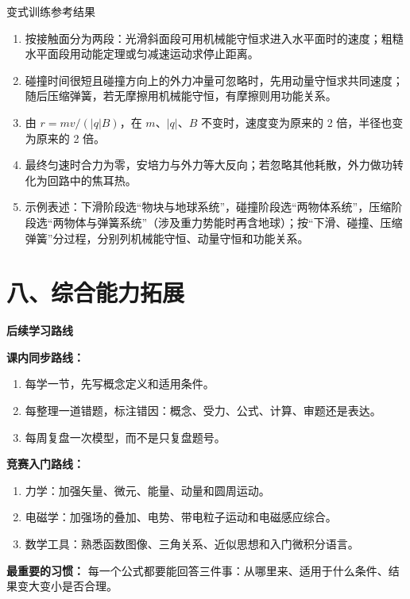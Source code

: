 \begin{learningbox}{变式训练参考结果}
\begin{enumerate}[itemsep=0.45em,topsep=0.3em,parsep=0pt]
  \item 按接触面分为两段：光滑斜面段可用机械能守恒求进入水平面时的速度；粗糙水平面段用动能定理或匀减速运动求停止距离。
  \item 碰撞时间很短且碰撞方向上的外力冲量可忽略时，先用动量守恒求共同速度；随后压缩弹簧，若无摩擦用机械能守恒，有摩擦则用功能关系。
  \item 由 $r=mv/(|q|B)$，在 $m$、$|q|$、$B$ 不变时，速度变为原来的 2 倍，半径也变为原来的 2 倍。
  \item 最终匀速时合力为零，安培力与外力等大反向；若忽略其他耗散，外力做功转化为回路中的焦耳热。
  \item 示例表述：下滑阶段选“物块与地球系统”，碰撞阶段选“两物体系统”，压缩阶段选“两物体与弹簧系统”（涉及重力势能时再含地球）；按“下滑、碰撞、压缩弹簧”分过程，分别列机械能守恒、动量守恒和功能关系。
\end{enumerate}
\end{learningbox}

\section*{八、综合能力拓展}
\begin{competitionbox}
\textbf{后续学习路线}

\begin{center}


\label{fig:learning-route-map}
\end{center}

\textbf{课内同步路线：}
\begin{enumerate}
  \item 每学一节，先写概念定义和适用条件。
  \item 每整理一道错题，标注错因：概念、受力、公式、计算、审题还是表达。
  \item 每周复盘一次模型，而不是只复盘题号。
\end{enumerate}

\textbf{竞赛入门路线：}
\begin{enumerate}
  \item 力学：加强矢量、微元、能量、动量和圆周运动。
  \item 电磁学：加强场的叠加、电势、带电粒子运动和电磁感应综合。
  \item 数学工具：熟悉函数图像、三角关系、近似思想和入门微积分语言。
\end{enumerate}

\textbf{最重要的习惯：} 每一个公式都要能回答三件事：从哪里来、适用于什么条件、结果变大变小是否合理。
\end{competitionbox}

